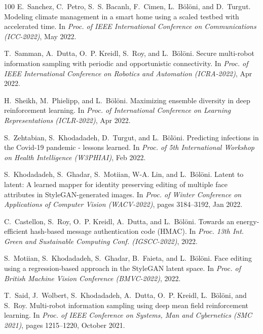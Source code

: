 \begin{thebibliography}{100}
E.~Sanchez, C.~Petro, S.~S. Bacanl{\i}, F.~Cimen, L.~Bölöni, and D.~Turgut.
\newblock Modeling climate management in a smart home using a scaled testbed
  with accelerated time.
\newblock In {\em Proc. of IEEE International Conference on Communications
  (ICC-2022)}, May 2022.

T.~Samman, A.~Dutta, O.~P. Kreidl, S.~Roy, and L.~Bölöni.
\newblock Secure multi-robot information sampling with periodic and
  opportunistic connectivity.
\newblock In {\em Proc. of IEEE International Conference on Robotics and
  Automation (ICRA-2022)}, Apr 2022.

H.~Sheikh, M.~Phielipp, and L.~Bölöni.
\newblock Maximizing ensemble diversity in deep reinforcement learning.
\newblock In {\em Proc. of International Conference on Learning Representations
  (ICLR-2022)}, Apr 2022.

S.~Zehtabian, S.~Khodadadeh, D.~Turgut, and L.~Bölöni.
\newblock Predicting infections in the {Covid-19} pandemic - lessons learned.
\newblock In {\em Proc. of 5th International Workshop on Health Intelligence
  (W3PHIAI)}, Feb 2022.

S.~Khodadadeh, S.~Ghadar, S.~Motiian, W-A. Lin, and L.~Bölöni.
\newblock Latent to latent: A learned mapper for identity preserving editing of
  multiple face attributes in {StyleGAN}-generated images.
\newblock In {\em Proc. of Winter Conference on Applications of Computer Vision
  (WACV-2022)}, pages 3184--3192, Jan 2022.

C.~Castellon, S.~Roy, O.~P. Kreidl, A.~Dutta, and L.~Bölöni.
\newblock Towards an energy-efficient hash-based message authentication code
  ({HMAC}).
\newblock In {\em Proc. 13th Int. Green and Sustainable Computing Conf.
  (IGSCC-2022)}, 2022.

S.~Motiian, S.~Khodadadeh, S.~Ghadar, B.~Faieta, and L.~Bölöni.
\newblock Face editing using a regression-based approach in the {StyleGAN}
  latent space.
\newblock In {\em Proc. of British Machine Vision Conference (BMVC-2022)},
  2022.

T.~Said, J.~Wolbert, S.~Khodadadeh, A.~Dutta, O.~P. Kreidl, L.~B{\"o}l{\"o}ni,
  and S.~Roy.
\newblock Multi-robot information sampling using deep mean field reinforcement
  learning.
\newblock In {\em Proc. of IEEE Conference on Systems, Man and Cybernetics (SMC
  2021)}, pages 1215--1220, October 2021.


\end{thebibliography}
